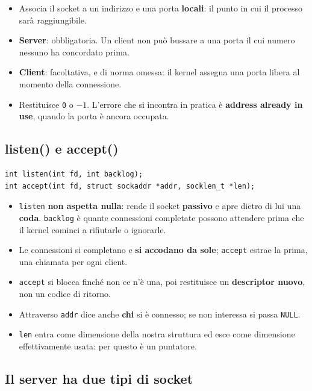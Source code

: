 \begin{itemize}
    \item Associa il socket a un indirizzo e una porta \textbf{locali}: il punto in cui il processo sarà raggiungibile.
    \item \textbf{Server}: obbligatoria. Un client non può bussare a una porta il cui numero nessuno ha concordato prima.
    \item \textbf{Client}: facoltativa, e di norma omessa: il kernel assegna una porta libera al momento della connessione.
    \item Restituisce \texttt{0} o $-1$. L'errore che si incontra in pratica è \textbf{address already in use}, quando la
          porta è ancora occupata.
\end{itemize}

\subsection{listen() e accept()}

\begin{lstlisting}[language={[POSIX]C}]
int listen(int fd, int backlog);
int accept(int fd, struct sockaddr *addr, socklen_t *len);
\end{lstlisting}

\begin{itemize}
    \item \texttt{listen} \textbf{non aspetta nulla}: rende il socket \textbf{passivo} e apre dietro di lui una
          \textbf{coda}. \texttt{backlog} è quante connessioni completate possono attendere prima che il kernel cominci a
          rifiutarle o ignorarle.
    \item Le connessioni si completano e \textbf{si accodano da sole}; \texttt{accept} estrae la prima, una chiamata per
          ogni client.
    \item \texttt{accept} si blocca finché non ce n'è una, poi restituisce un \textbf{descriptor nuovo}, non un codice di
          ritorno.
    \item Attraverso \texttt{addr} dice anche \textbf{chi} si è connesso; se non interessa si passa \texttt{NULL}.
    \item \texttt{len} entra come dimensione della nostra struttura ed esce come dimensione effettivamente usata: per
          questo è un puntatore.
\end{itemize}

\subsection{Il server ha due tipi di socket}

